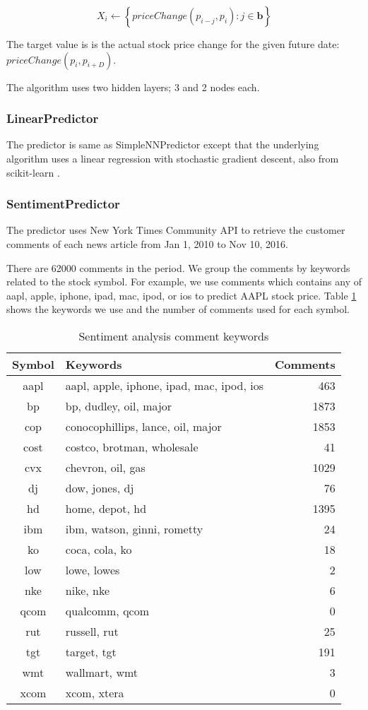 \documentclass[twocolumn,10pt]{asme2ej}
\newcommand{\vect}[1]{\boldsymbol{#1}}
\begin{document}
\[
X_i \gets \left\{priceChange(p_{i - j}, p_i) : j \in \vect{b}\right\}
\]

The target value is is the actual stock price change for the given
future date: $priceChange(p_i, p_{i+D})$.

The algorithm uses two hidden layers; 3 and 2 nodes each.

\subsubsection{LinearPredictor}
The predictor is same as SimpleNNPredictor except that the underlying
algorithm uses a linear regression with stochastic gradient descent,
also from scikit-learn \cite{web:scikit_learn}.

\subsubsection{SentimentPredictor}

The predictor uses New York Times Community API
\cite{web:nytimes_community_api} to retrieve the customer comments of
each news article from Jan 1, 2010 to Nov 10, 2016.

There are 62000 comments in the period. We group the comments by
keywords related to the stock symbol. For example, we use comments
which contains any of aapl, apple, iphone, ipad, mac, ipod, or ios to
predict AAPL stock price. Table \ref{sentiment_keywords} shows the
keywords we use and the number of comments used for each symbol.


\begin{table}
  \begin{tabular}{clr}
    Symbol & Keywords & Comments \\
    \hline
    aapl & aapl, apple, iphone, ipad, mac, ipod, ios & 463 \\
    bp & bp, dudley, oil, major & 1873 \\
    cop & conocophillips, lance, oil, major & 1853 \\
    cost & costco, brotman, wholesale & 41 \\
    cvx & chevron, oil, gas & 1029 \\
    dj & dow, jones, dj & 76 \\
    hd & home, depot, hd & 1395 \\
    ibm & ibm, watson, ginni, rometty & 24 \\
    ko & coca, cola, ko & 18 \\
    low & lowe, lowes & 2 \\
    nke & nike, nke & 6 \\
    qcom & qualcomm, qcom & 0 \\
    rut & russell, rut & 25 \\
    tgt & target, tgt & 191 \\
    wmt & wallmart, wmt & 3 \\
    xcom & xcom, xtera & 0 \\
  \end{tabular}
  \caption{Sentiment analysis comment keywords}
  \label{sentiment_keywords}
\end{table}
\end{document}
